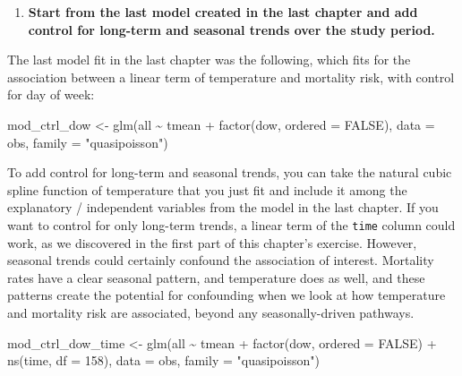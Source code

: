 \documentclass[
]{book}
\newenvironment{Shaded}{\begin{snugshade}}{\end{snugshade}}
\newcommand{\AttributeTok}[1]{\textcolor[rgb]{0.77,0.63,0.00}{#1}}
\newcommand{\ConstantTok}[1]{\textcolor[rgb]{0.00,0.00,0.00}{#1}}
\newcommand{\DecValTok}[1]{\textcolor[rgb]{0.00,0.00,0.81}{#1}}
\newcommand{\FunctionTok}[1]{\textcolor[rgb]{0.00,0.00,0.00}{#1}}
\newcommand{\NormalTok}[1]{#1}
\newcommand{\OtherTok}[1]{\textcolor[rgb]{0.56,0.35,0.01}{#1}}
\newcommand{\SpecialCharTok}[1]{\textcolor[rgb]{0.00,0.00,0.00}{#1}}
\newcommand{\StringTok}[1]{\textcolor[rgb]{0.31,0.60,0.02}{#1}}
\providecommand{\tightlist}{%
  \setlength{\itemsep}{0pt}\setlength{\parskip}{0pt}}
\begin{document}
\begin{enumerate}
\def\labelenumi{\arabic{enumi}.}
\setcounter{enumi}{1}
\tightlist
\item
  \textbf{Start from the last model created in the last chapter and add control for
  long-term and seasonal trends over the study period.}
\end{enumerate}

The last model fit in the last chapter was the following, which fits for the
association between a linear term of temperature and mortality risk, with control
for day of week:

\begin{Shaded}
\begin{Highlighting}[]
\NormalTok{mod\_ctrl\_dow }\OtherTok{\textless{}{-}} \FunctionTok{glm}\NormalTok{(all }\SpecialCharTok{\textasciitilde{}}\NormalTok{ tmean }\SpecialCharTok{+} \FunctionTok{factor}\NormalTok{(dow, }\AttributeTok{ordered =} \ConstantTok{FALSE}\NormalTok{), }
                    \AttributeTok{data =}\NormalTok{ obs, }\AttributeTok{family =} \StringTok{"quasipoisson"}\NormalTok{)}
\end{Highlighting}
\end{Shaded}

To add control for long-term and seasonal trends, you can take the natural cubic
spline function of temperature that you just fit and include it among the
explanatory / independent variables from the model in the last chapter. If you
want to control for only long-term trends, a linear term of the \texttt{time} column
could work, as we discovered in the first part of this chapter's exercise.
However, seasonal trends could certainly confound the association of interest.
Mortality rates have a clear seasonal pattern, and temperature does as well,
and these patterns create the potential for confounding when we look at how
temperature and mortality risk are associated, beyond any seasonally-driven
pathways.

\begin{Shaded}
\begin{Highlighting}[]
\NormalTok{mod\_ctrl\_dow\_time }\OtherTok{\textless{}{-}} \FunctionTok{glm}\NormalTok{(all }\SpecialCharTok{\textasciitilde{}}\NormalTok{ tmean }\SpecialCharTok{+} \FunctionTok{factor}\NormalTok{(dow, }\AttributeTok{ordered =} \ConstantTok{FALSE}\NormalTok{) }\SpecialCharTok{+}
                           \FunctionTok{ns}\NormalTok{(time, }\AttributeTok{df =} \DecValTok{158}\NormalTok{), }
                         \AttributeTok{data =}\NormalTok{ obs, }\AttributeTok{family =} \StringTok{"quasipoisson"}\NormalTok{)}
\end{Highlighting}
\end{Shaded}
\end{document}
